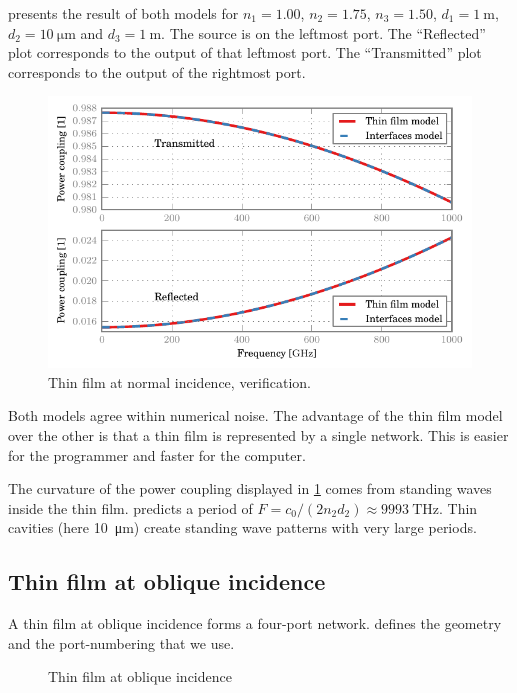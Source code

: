  presents the result of both models for
$n_1=1.00$, $n_2=1.75$, $n_3=1.50$,
$d_1=\SI{1}{\meter}$, $d_2=\SI{10}{\micro\meter}$ and $d_3=\SI{1}{\meter}$.
The source is on the leftmost port.
The ``Reflected'' plot corresponds to the output of that leftmost port.
The ``Transmitted'' plot corresponds to the output of the rightmost port.
\begin{figure}[hbtp]
    \centering
    \includegraphics{thin_film_normal_verification.pdf}
    \caption{Thin film at normal incidence, verification.}
    \label{fig:thin_film_normal_verification}
\end{figure}

Both models agree within numerical noise.
The advantage of the thin film model over the other is that a thin film is represented by a single network.
This is easier for the programmer and faster for the computer.

The curvature of the power coupling displayed in \cref{fig:thin_film_normal_verification} comes from standing waves inside the thin film.
 predicts a period of $F = c_0 / (2 n_2 d_2) \approx \SI{9993}{\tera\hertz}$.
Thin cavities (here \SI{10}{\micro\meter}) create standing wave patterns with very large periods.



\subsection{Thin film at oblique incidence}
\label{sec:thin_film_at_oblique_incidence}

A thin film at oblique incidence forms a four-port network.
 defines the geometry and the port-numbering that we use.
\begin{figure}[hbtp]
    \centering
    \caption{Thin film at oblique incidence}
    \label{fig:thin_film_oblique}
\end{figure}

